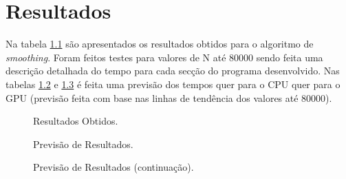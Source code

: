 \chapter{Resultados}

Na tabela \ref{tabela} são apresentados os resultados obtidos para o algoritmo de \textit{smoothing}. Foram feitos testes para valores de N até 80000 sendo feita uma descrição detalhada do tempo para cada secção do programa desenvolvido. Nas tabelas \ref{tabela1} e \ref{tabela2} é feita uma previsão dos tempos quer para o CPU quer para o GPU (previsão feita com base nas linhas de tendência dos valores até 80000).

\begin{figure}[H]
	\begin{center}
		\caption{Resultados Obtidos.}
		\label{tabela}
	\end{center}
\end{figure}

\begin{figure}[H]
	\begin{center}
		\caption{Previsão de Resultados.}
		\label{tabela1}
	\end{center}
\end{figure}

\begin{figure}[H]
	\begin{center}
		\caption{Previsão de Resultados (continuação).}
		\label{tabela2}
	\end{center}
\end{figure}

